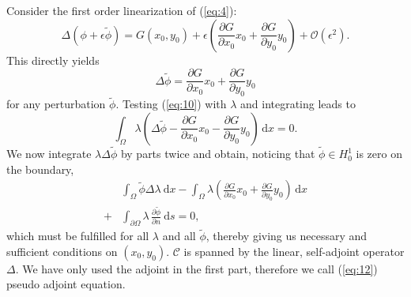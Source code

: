Consider the first order linearization of (\ref{eq:4}):
\begin{equation}\label{eq:9}
	\Delta\left(\phi+\epsilon\widetilde{\phi}\right)
	= G(x_0,y_0)+\epsilon
		\left(\frac{\partial G}{\partial x_0}x_0+\frac{\partial G}{\partial y_0}y_0\right)
		+ \mathcal O(\epsilon^2).
\end{equation}
This directly yields
\begin{equation}\label{eq:10}
	\Delta\widetilde{\phi} 
	= \frac{\partial G}{\partial x_0}x_0+\frac{\partial G}{\partial y_0}y_0
\end{equation}
for any perturbation $\widetilde{\phi}$.
Testing (\ref{eq:10}) with $\lambda$ and integrating leads to
\begin{equation}\label{eq:11}
	\int_\Omega \lambda \left( 
		\Delta\widetilde{\phi} 
		- \frac{\partial G}{\partial x_0}x_0-\frac{\partial G}{\partial y_0}y_0
	\right)\,\mathrm{d}x
	= 0.
\end{equation}
We now integrate $\lambda\Delta \widetilde{\phi}$ by parts twice and obtain, noticing that $\widetilde{\phi}\in H^1_0$ is zero on the boundary, 
\begin{align}\label{eq:12}
	&\int_\Omega \widetilde{\phi} \Delta\lambda \:\mathrm{d}x
	-\int_\Omega\lambda \left( 
	 \frac{\partial G}{\partial x_0}x_0+\frac{\partial G}{\partial y_0}y_0
	\right)\,\mathrm{d}x\\
	+&\int_{\partial \Omega} \lambda \,\frac{\partial\widetilde{\phi}}{\partial n}\:\mathrm{d}s
	= 0,\nonumber
\end{align}
which must be fulfilled for all $\lambda$ and all $\widetilde{\phi}$, thereby giving us necessary and sufficient conditions on $(x_0,y_0)$. $\mathcal{C}$ is spanned by the linear, self-adjoint operator $\Delta$. We have only used the adjoint in the first part, therefore we call (\ref{eq:12}) pseudo adjoint equation.

